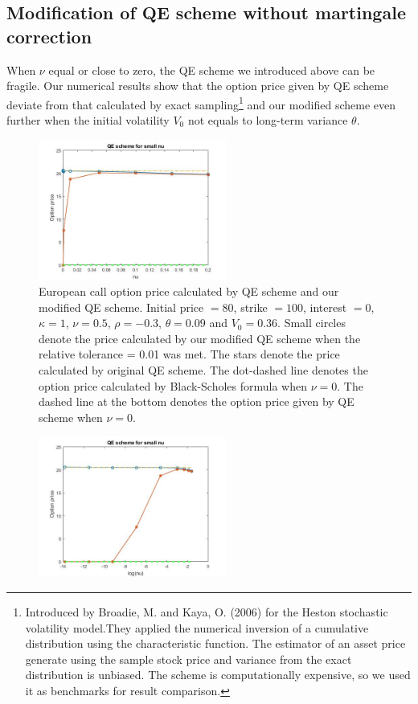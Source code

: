 \documentclass{ws-ijfe}
\begin{document}
\subsection{Modification of QE scheme without martingale correction}
When $\nu$ equal or close to zero, the QE scheme we introduced above can be fragile. Our numerical results show that the option price given by QE scheme deviate from that calculated by exact sampling\footnote{Introduced by Broadie, M. and Kaya, O. (2006) for the Heston stochastic volatility model.They applied the numerical inversion of a cumulative distribution using the characteristic function. The estimator of an asset price generate using the sample stock price and variance from the exact distribution is unbiased. The scheme is computationally expensive, so we used it as benchmarks for result comparison.} and our modified scheme even further when the initial volatility $V_0$ not equals to long-term variance $\theta$. %
\begin{figure}[h]
\centering
\includegraphics[width=0.55\textwidth]{FigureIn2_3_1}
\caption{European call option price calculated by QE scheme and our modified QE scheme. Initial price $=80$, strike $=100$, interest $=0$, $\kappa=1$, $\nu=0.5$, $\rho=-0.3$, $\theta=0.09$ and $V_0=0.36$. Small circles denote the price calculated by our modified QE scheme when the relative tolerance = 0.01 was met. The stars denote the price calculated by original QE scheme. The dot-dashed line denotes the option price calculated by Black-Scholes formula when $\nu=0$. The dashed line at the bottom denotes the option price given by QE scheme when $\nu=0$. }
\end{figure}
\begin{figure}[h]
\centering
\includegraphics[width=0.55\textwidth]{FigureIn2_3_1_log}
\end{figure}
\end{document}
